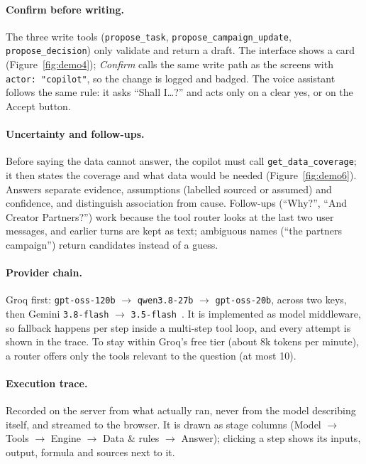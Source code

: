 \documentclass[11pt,a4paper]{article}
\newcommand{\code}[1]{\texttt{#1}}
\begin{document}
\paragraph{Confirm before writing.} The three write tools (\code{propose\_task}, \code{propose\_campaign\_update}, \code{propose\_decision}) only validate and return a draft. The interface shows a card (Figure~\ref{fig:demo4}); \emph{Confirm} calls the same write path as the screens with \code{actor: "copilot"}, so the change is logged and badged. The voice assistant follows the same rule: it asks ``Shall I\ldots?'' and acts only on a clear yes, or on the Accept button.

\paragraph{Uncertainty and follow-ups.} Before saying the data cannot answer, the copilot must call \code{get\_data\_coverage}; it then states the coverage and what data would be needed (Figure~\ref{fig:demo6}). Answers separate evidence, assumptions (labelled sourced or assumed) and confidence, and distinguish association from cause. Follow-ups (``Why?'', ``And Creator Partners?'') work because the tool router looks at the last two user messages, and earlier turns are kept as text; ambiguous names (``the partners campaign'') return candidates instead of a guess.

\paragraph{Provider chain.} Groq first: \code{gpt-oss-120b} $\to$ \code{qwen3.8-27b} $\to$ \code{gpt-oss-20b}, across two keys, then Gemini \code{3.8-flash} $\to$ \code{3.5-flash}~\cite{groqLimits,geminiModels}. It is implemented as model middleware, so fallback happens per step inside a multi-step tool loop, and every attempt is shown in the trace. To stay within Groq's free tier (about 8k tokens per minute), a router offers only the tools relevant to the question (at most 10).

\paragraph{Execution trace.} Recorded on the server from what actually ran, never from the model describing itself, and streamed to the browser. It is drawn as stage columns (Model $\to$ Tools $\to$ Engine $\to$ Data \& rules $\to$ Answer); clicking a step shows its inputs, output, formula and sources next to it.
\end{document}
